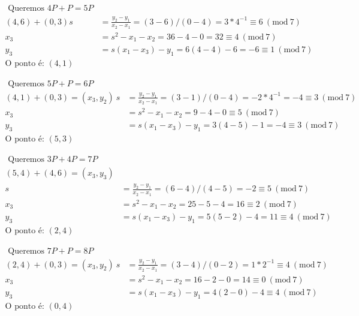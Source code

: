 \documentclass[a4paper]{article}
\newcommand{\Mod}[1]{\ (\mathrm{mod}\ #1)}
\begin{document}
\begin{equation}
  \begin{align*}
    \text{ Queremos }4P+P = 5P\\
    (4, 6) + (0, 3) 
    s &= \frac{y_2 - y_1}{x_2 - x_1} = (3 - 6)/(0 - 4) = 3 * 4^{-1} \equiv 6 \Mod{7}\\
    x_3 &= s^2 - x_1 - x_2 = 36 - 4 - 0 = 32 \equiv 4 \Mod{7}\\
    y_3 &= s(x_1 - x_3) - y_1 = 6(4 - 4) - 6 = -6 \equiv 1 \Mod{7}\\
    \text{O ponto é: }(4, 1)
  \end{align*}
\end{equation}

\begin{equation}
  \begin{align*}
    \text{ Queremos }5P+P = 6P\\
    (4, 1) + (0, 3) = (x_3, y_2)\
    s &= \frac{y_2 - y_1}{x_2 - x_1} = (3 - 1)/(0 - 4) = -2 * 4^{-1} = -4 \equiv 3 \Mod{7}\\
    x_3 &= s^2 - x_1 - x_2 = 9 - 4 - 0 \equiv 5 \Mod{7}\\
    y_3 &= s(x_1 - x_3) - y_1 = 3(4 - 5) - 1 = -4 \equiv 3 \Mod{7}\\
    \text{O ponto é: }(5, 3)
  \end{align*}
\end{equation}

\begin{equation}
  \begin{align*}
    \text{ Queremos }3P+4P = 7P\\
    (5, 4) + (4, 6) = (x_3, y_3)\\
    s &= \frac{y_2 - y_1}{x_2 - x_1} = (6 - 4)/(4 - 5) = -2 \equiv 5\Mod{7}\\
    x_3 &= s^2 - x_1 - x_2 = 25 - 5 - 4 = 16 \equiv 2 \Mod{7}\\
    y_3 &= s(x_1 - x_3) - y_1 = 5(5 - 2) - 4 = 11 \equiv 4 \Mod{7}\\
    \text{O ponto é: }(2, 4)
  \end{align*}
\end{equation}

\begin{equation}
  \begin{align*}
    \text{ Queremos }7P+P = 8P\\
    (2, 4) + (0, 3) = (x_3, y_2)\
    s &= \frac{y_2 - y_1}{x_2 - x_1} = (3 - 4)/(0 - 2) = 1 * 2^{-1} \equiv 4 \Mod{7}\\
    x_3 &= s^2 - x_1 - x_2 = 16 - 2 - 0 = 14 \equiv 0 \Mod{7}\\
    y_3 &= s(x_1 - x_3) - y_1 = 4(2 - 0) - 4 \equiv 4 \Mod{7}\\
    \text{O ponto é: }(0, 4)
  \end{align*}
\end{equation}
\end{document}
